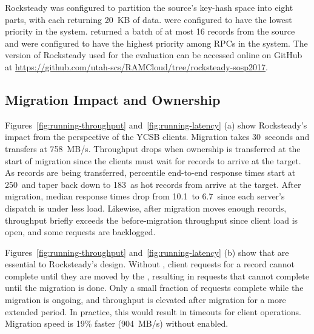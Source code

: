 Rocksteady was configured to partition the source's key-hash space into
eight parts, with each \pull returning 20~KB of data. \pulls were configured
to have the lowest priority in the system. \priopulls returned a batch
of at most 16 records from the
source and were configured
to have the highest priority among RPCs in the system. The version of Rocksteady
used for the evaluation can be accessed online on GitHub at\linebreak{}
{\url{https://github.com/utah-scs/RAMCloud/tree/rocksteady-sosp2017}}.

\subsection{Migration Impact and Ownership}
\label{sec:e2e}
Figures~\ref{fig:running-throughput} and~\ref{fig:running-latency} (a) show
Rocksteady's impact from the perspective of the YCSB clients. Migration
takes 30~seconds and transfers at 758~MB/s. Throughput drops when ownership is
transferred at the start of migration since the clients must wait for records
to arrive at the target. As records are being transferred, \nnnth percentile
end-to-end response times start at 250~\us and taper back down to 183~\us as
hot records from \priopulls arrive at the target. After migration, median
response times drop from 10.1~\us to 6.7~\us since each server's dispatch is under
less load. Likewise, after migration moves enough records, throughput briefly
exceeds the before-migration throughput since client load is open, and some
requests are backlogged.

Figures~\ref{fig:running-throughput} and~\ref{fig:running-latency} (b) show
that \priopulls are essential to Rocksteady's design. Without
\priopulls, client
requests for a record cannot complete until they are moved by the
\pulls, resulting in requests that cannot complete
until the migration is done. Only a small fraction of requests complete
while the migration is ongoing, and throughput is elevated after
migration for a more extended period. In practice, this would result in
timeouts for client operations. Migration speed is 19\% faster
(904~MB/s) without \priopulls enabled.

